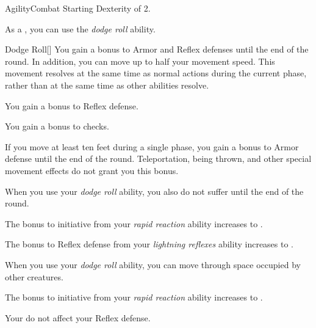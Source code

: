     \begin{feat}{Agility}{Combat}
        \featpre Starting Dexterity of 2.

         As a , you can use the \textit{dodge roll} ability.
        \begin{ability}{Dodge Roll}[]
            You gain a  bonus to Armor and Reflex defenses until the end of the round.
            In addition, you can move up to half your movement speed.
            This movement resolves at the same time as normal actions during the current phase, rather than at the same time as other  abilities resolve.
        \end{ability}

         You gain a  bonus to Reflex defense.

         You gain a  bonus to  checks.

         If you move at least ten feet during a single phase, you gain a  bonus to Armor defense until the end of the round.
        Teleportation, being thrown, and other special movement effects do not grant you this bonus.

         When you use your \textit{dodge roll} ability, you also do not suffer  until the end of the round.

         The bonus to initiative from your \textit{rapid reaction} ability increases to .

         The bonus to Reflex defense from your \textit{lightning reflexes} ability increases to .

         When you use your \textit{dodge roll} ability, you can move through space occupied by other creatures.

         The bonus to initiative from your \textit{rapid reaction} ability increases to .

         Your  do not affect your Reflex defense.
    \end{feat}

